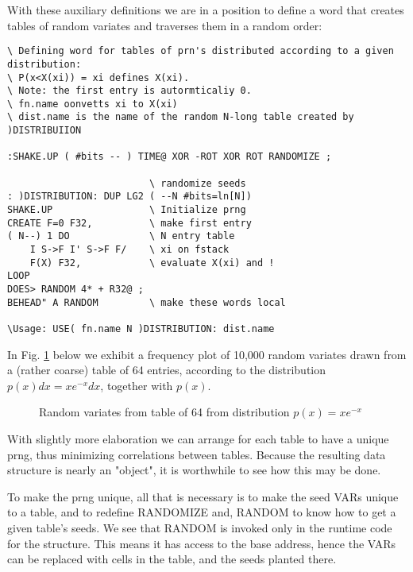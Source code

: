 With these auxiliary definitions we are in a position to define a
word that creates tables of random variates and traverses them in a random order:

\begin{verbatim}
\ Defining word for tables of prn's distributed according to a given distribution:
\ P(x<X(xi)) = xi defines X(xi).
\ Note: the first entry is autormticaliy 0.  
\ fn.name oonvetts xi to X(xi) 
\ dist.name is the name of the random N-long table created by )DISTRIBUIION

:SHAKE.UP ( #bits -- ) TIME@ XOR -ROT XOR ROT RANDOMIZE ;

                         \ randomize seeds
: )DISTRIBUTION: DUP LG2 ( --N #bits=ln[N])
SHAKE.UP                 \ Initialize prng
CREATE F=0 F32,          \ make first entry
( N--) 1 DO              \ N entry table
    I S->F I' S->F F/    \ xi on fstack
    F(X) F32,            \ evaluate X(xi) and !
LOOP
DOES> RANDOM 4* + R32@ ;
BEHEAD" A RANDOM         \ make these words local

\Usage: USE( fn.name N )DISTRIBUTION: dist.name
\end{verbatim}
In Fig. \ref{fig:03_05} below we exhibit a frequency plot of 10,000 random
variates drawn from a (rather coarse) table of 64 entries, according to the
distribution $p(x)dx=xe^{-x}dx$, together with $p(x)$.
\begin{figure}
    \caption{Random variates from table of 64 from distribution $p(x)=xe^{-x}$}
    \label{fig:03_05}
\end{figure}

With slightly more elaboration we can arrange for each table to 
have a unique prng, thus minimizing correlations between
tables. Because the resulting data structure is nearly an "object",
it is worthwhile to see how this may be done.

To make the prng unique, all that is necessary is to make the seed
VARs unique to a table, and to redefine RANDOMIZE and,
RANDOM to know how to get a given table's seeds. We see that
RANDOM is invoked only in the runtime code for the structure.
This means it has access to the base address, hence the VARs
can be replaced with cells in the table, and the seeds planted there.

